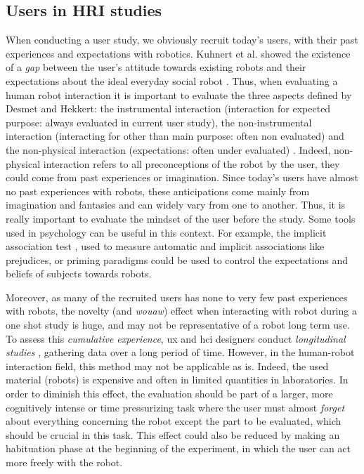 \documentclass[a4paper,11pt,twoside]{StyleThese}
\begin{document}
\subsection{Users in HRI studies}
When conducting a user study, we obviously recruit today's users, with their past experiences and expectations with robotics. Kuhnert et al. showed the existence of a \textit{gap} between the user's attitude towards existing robots and their expectations about the  ideal everyday social robot \cite{kuhnert2017gap}. Thus, when evaluating a human robot interaction it is important to evaluate the three aspects defined by Desmet and Hekkert: the instrumental interaction (interaction for expected purpose: always evaluated in current user study), the non-instrumental interaction (interacting for other than main purpose: often non evaluated) and the non-physical interaction (expectations: often under evaluated) \cite{desmet2007framework}. Indeed, non-physical interaction refers to all preconceptions of the robot by the user, they could come from past experiences or imagination. Since today's users have almost no past experiences with robots, these anticipations come mainly from imagination and fantasies and can widely vary from one to another. Thus, it is really important to evaluate the mindset of the user before the study. Some tools used in psychology can be useful in this context. For example, the implicit association test \cite{greenwald1998measuring}, used to measure automatic and implicit associations like prejudices, or priming paradigms could be used to control the expectations and beliefs of subjects towards robots.

Moreover, as many of the recruited users has none to very few past experiences with robots, the novelty (and \textit{wouaw}) effect when interacting with robot during a one shot study is huge, and may not be representative of a robot long term use. To assess this \textit{cumulative experience}, \acrfull{ux} and \acrfull{hci} designers conduct \textit{longitudinal studies} \cite{lazar2017research}, gathering data over a long period of time. However, in the human-robot interaction field, this method may not be applicable as is. Indeed, the used material (robots) is expensive and often in limited quantities in laboratories. In order to diminish this effect, the evaluation should be part of a larger, more cognitively intense or time pressurizing task where the user must almost \textit{forget} about everything concerning the robot except the part to be evaluated, which should be crucial in this task. This effect could also be reduced by making an habituation phase at the beginning of the experiment, in which the user can act more freely with the robot.
\end{document}
